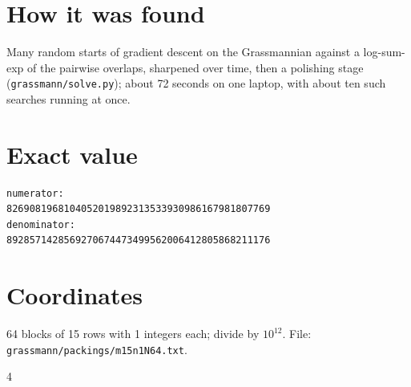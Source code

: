 \documentclass[11pt,a4paper]{article}
\begin{document}
\section{How it was found}
Many random starts of gradient descent on the Grassmannian against a log-sum-exp of the pairwise overlaps, sharpened over time, then a polishing stage (\texttt{grassmann/solve.py}); about 72 seconds on one laptop, with about ten such searches running at once.


\appendix
\section{Exact value}
{\small
\begin{verbatim}
numerator:
8269081968104052019892313533930986167981807769
denominator:
8928571428569270674473499562006412805868211176
\end{verbatim}}

\section{Coordinates}
64 blocks of 15 rows with 1 integers each; divide by $10^{12}$. File: \texttt{grassmann/packings/m15n1N64.txt}.
{\tiny
\begin{multicols}{4}
\end{multicols}}
\end{document}
